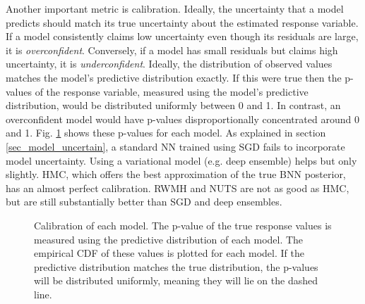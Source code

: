 \documentclass[12pt]{article}
\begin{document}
Another important metric is calibration. Ideally, the uncertainty that a model predicts should match its true uncertainty about the estimated response variable. If a model consistently claims low uncertainty even though its residuals are large, it is \textit{overconfident}. Conversely, if a model has small residuals but claims high uncertainty, it is \textit{underconfident}. Ideally, the distribution of observed values matches the model's predictive distribution exactly. If this were true then the p-values of the response variable, measured using the model's predictive distribution, would be distributed uniformly between 0 and 1. In contrast, an overconfident model would have p-values disproportionally concentrated around 0 and 1. Fig. \ref{fig_uci_residuals_pvals} shows these p-values for each model. As explained in section \ref{sec_model_uncertain}, a standard NN trained using SGD fails to incorporate model uncertainty. Using a variational model (e.g. deep ensemble) helps but only slightly. HMC, which offers the best approximation of the true BNN posterior, has an almost perfect calibration. RWMH and NUTS are not as good as HMC, but are still substantially better than SGD and deep ensembles.

\begin{figure}[H]
\centering
{}
\caption{Calibration of each model. The p-value of the true response values is measured using the predictive distribution of each model. The empirical CDF of these values is plotted for each model. If the predictive distribution matches the true distribution, the p-values will be distributed uniformly, meaning they will lie on the dashed line.}
\label{fig_uci_residuals_pvals}
\end{figure}
\end{document}
